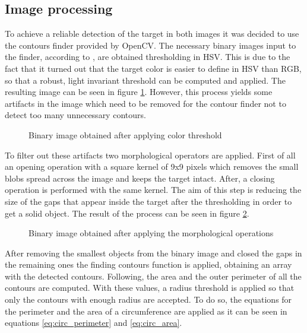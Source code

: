 \subsection{Image processing}
To achieve a reliable detection of the target in both images it was decided to use the contours finder provided by OpenCV.
The necessary binary images input to the finder, according to \cite{suzuki}, are obtained thresholding in HSV.
This is due to the fact that it turned out that the target color is easier to define in HSV than RGB, so that a robust, light invariant threshold can be computed and applied. The resulting image can be seen in figure \ref{fig:binary_image}.
However, this process yields some artifacts in the image which need to be removed for the contour finder not to detect too many unnecessary contours.
 
\begin{figure}[!ht]
    \centering
    \caption{Binary image obtained after applying color threshold}
    \label{fig:binary_image}
\end{figure}

To filter out these artifacts two morphological operators are applied. First of all an opening operation with a square kernel of 9x9 pixels which removes the small blobs spread across the image and keeps the target intact. After, a closing operation is performed with the same kernel. The aim of this step is reducing the size of the gaps that appear inside the target after the thresholding in order to get a solid object. The result of the process can be seen in figure \ref{fig:filtered_image}.

\begin{figure}[h]
    \centering
    \caption{Binary image obtained after applying the morphological operations}
    \label{fig:filtered_image}
\end{figure}

After removing the smallest objects from the binary image and closed the gaps in the remaining ones the finding contours function is applied, obtaining an array with the detected contours. Following, the area and the outer perimeter of all the contours are computed. With these values, a radius threshold is applied so that only the contours with enough radius are accepted. To do so, the equations for the perimeter and the area of a circumference are applied as it can be seen in equations \ref{eq:circ_perimeter} and \ref{eq:circ_area}.

